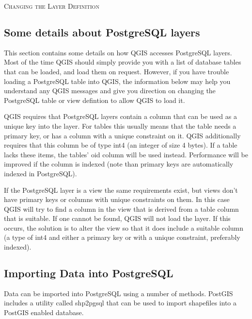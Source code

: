 \begin{Tip}\caption{\textsc{Changing the Layer Definition}}
\end{Tip}

\subsection{Some details about PostgreSQL layers}\label{sec:postgis_details}
This section contains some details on how QGIS accesses PostgreSQL
layers. Most of the time QGIS should simply provide you with a list of
database tables that can be loaded, and load them on request. However,
if you have trouble 
loading a PostgreSQL table into QGIS, the information below may help
you understand any QGIS messages and give you direction on changing
the PostgreSQL table or view defintion to allow QGIS to load it.

QGIS requires that PostgreSQL layers contain a column that can be
used as a unique key into the layer. For tables this usually means
that the table needs a primary key, or has a column with a unique
constraint on it. QGIS additionally requires that this column be of
type int4 (an integer of size 4 bytes). If a table lacks these items,
the tables' oid column will 
be used instead. Performance will be improved if the column is
indexed (note than primary keys are automatically indexed in PostgreSQL). 

If the PostgreSQL layer is a view the same requirements exist, but
views don't have primary keys or columns with unique constraints on
them. In this case QGIS will try to find a column in the view that is
derived from a table column that is suitable. If one cannot be found,
QGIS will not load the layer. If this occurs, the solution is to alter
the view so that it does include a suitable column (a type of int4
and either a primary key or with a unique constraint, preferably indexed).

\subsection{Importing Data into PostgreSQL}\label{sec:loading_postgis_data}
Data can be imported into PostgreSQL using a number of methods. PostGIS includes a utility called shp2pgsql that can be used to import shapefiles into a PostGIS enabled database. 

